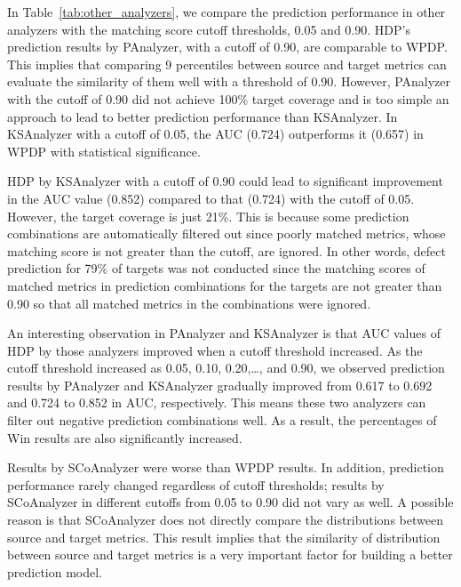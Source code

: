% 

In Table~\ref{tab:other_analyzers}, we compare the prediction performance in
other analyzers with the matching score cutoff thresholds, 0.05 and 0.90.
HDP's prediction results by PAnalyzer, with a cutoff of 0.90, are
comparable to WPDP. This
implies that comparing 9 percentiles between source and target metrics can
evaluate the similarity of them well with a threshold of 0.90. However,
PAnalyzer with the cutoff of 0.90 did not achieve 100\% target coverage and is
too simple an approach to lead to better prediction performance than KSAnalyzer. In
KSAnalyzer with a cutoff of 0.05, the AUC (0.724) outperforms it (0.657) in WPDP
with statistical significance.

HDP by KSAnalyzer with a cutoff of 0.90 could lead to significant
improvement in the AUC value (0.852) compared to that (0.724) with the
cutoff of 0.05.
However, the target coverage is just 21\%. This is because some prediction
combinations are automatically filtered out since poorly matched metrics, whose
matching score is not greater than the cutoff, are ignored. In other words,
defect prediction for 79\% of targets was not
conducted since the matching scores of matched metrics in prediction
combinations for the targets are not greater than 0.90 so
that all matched metrics in the combinations were ignored.

An interesting observation in PAnalyzer and KSAnalyzer is that AUC
values of HDP by those analyzers improved when a cutoff threshold
increased. As the cutoff threshold increased as 0.05, 0.10, 0.20,\ldots, and
0.90, we observed prediction results by PAnalyzer and KSAnalyzer
gradually improved from 0.617 to 0.692 and 0.724 to 0.852 in AUC, respectively.
This means these two analyzers can filter out negative prediction combinations
well. As a result, the percentages of Win results are also significantly
increased.

Results by SCoAnalyzer were
worse than WPDP results. In addition,
prediction performance rarely changed regardless of cutoff thresholds; results
by SCoAnalyzer in different cutoffs from 0.05 to 0.90 did not
vary as well.
A possible reason is that SCoAnalyzer does not directly compare
the distributions between source and target metrics.
This result implies that the similarity of distribution between source and
target metrics is a very important factor for building a better
prediction model.


